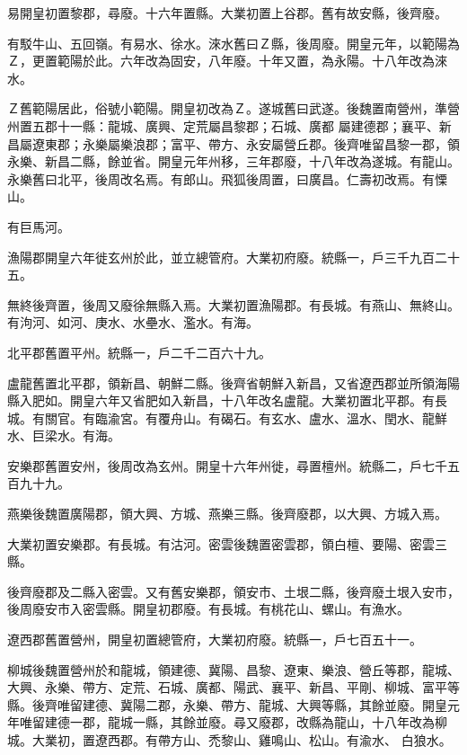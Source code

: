 \begin{pinyinscope}
 易開皇初置黎郡，尋廢。十六年置縣。大業初置上谷郡。舊有故安縣，後齊廢。



 有駁牛山、五回嶺。有易水、徐水。淶水舊曰Ｚ縣，後周廢。開皇元年，以範陽為Ｚ，更置範陽於此。六年改為固安，八年廢。十年又置，為永陽。十八年改為淶水。



 Ｚ舊範陽居此，俗號小範陽。開皇初改為Ｚ。遂城舊曰武遂。後魏置南營州，準營州置五郡十一縣：龍城、廣興、定荒屬昌黎郡；石城、廣都
 屬建德郡；襄平、新昌屬遼東郡；永樂屬樂浪郡；富平、帶方、永安屬營丘郡。後齊唯留昌黎一郡，領永樂、新昌二縣，餘並省。開皇元年州移，三年郡廢，十八年改為遂城。有龍山。永樂舊曰北平，後周改名焉。有郎山。飛狐後周置，曰廣昌。仁壽初改焉。有慄山。



 有巨馬河。



 漁陽郡開皇六年徙玄州於此，並立總管府。大業初府廢。統縣一，戶三千九百二十五。



 無終後齊置，後周又廢徐無縣入焉。大業初置漁陽郡。有長城。有燕山、無終山。有泃河、如河、庚水、水壘水、濫水。有海。



 北平郡舊置平州。統縣一，戶二千二百六十九。



 盧龍舊置北平郡，領新昌、朝鮮二縣。後齊省朝鮮入新昌，又省遼西郡並所領海陽縣入肥如。開皇六年又省肥如入新昌，十八年改名盧龍。大業初置北平郡。有長城。有關官。有臨渝宮。有覆舟山。有碣石。有玄水、盧水、溫水、閏水、龍鮮水、巨梁水。有海。



 安樂郡舊置安州，後周改為玄州。開皇十六年州徙，尋置檀州。統縣二，戶七千五百九十九。



 燕樂後魏置廣陽郡，領大興、方城、燕樂三縣。後齊廢郡，以大興、方城入焉。



 大業初置安樂郡。有長城。有沽河。密雲後魏置密雲郡，領白檀、要陽、密雲三縣。



 後齊廢郡及二縣入密雲。又有舊安樂郡，領安市、土垠二縣，後齊廢土垠入安市，後周廢安市入密雲縣。開皇初郡廢。有長城。有桃花山、螺山。有漁水。



 遼西郡舊置營州，開皇初置總管府，大業初府廢。統縣一，戶七百五十一。



 柳城後魏置營州於和龍城，領建德、冀陽、昌黎、遼東、樂浪、營丘等郡，龍城、大興、永樂、帶方、定荒、石城、廣都、陽武、襄平、新昌、平剛、柳城、富平等縣。後齊唯留建德、冀陽二郡，永樂、帶方、龍城、大興等縣，其餘並廢。開皇元年唯留建德一郡，龍城一縣，其餘並廢。尋又廢郡，改縣為龍山，十八年改為柳城。大業初，置遼西郡。有帶方山、禿黎山、雞鳴山、松山。有渝水、
 白狼水。




\end{pinyinscope}
